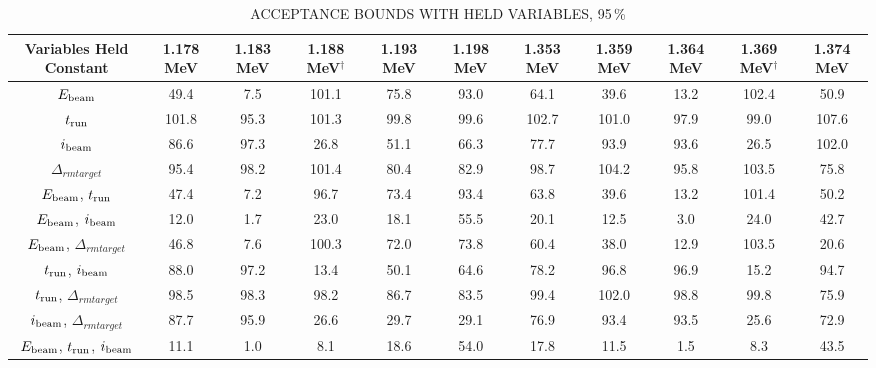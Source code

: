 \begin{landscape}
\begin{table}
    \begin{center}
        \caption{ACCEPTANCE BOUNDS WITH HELD VARIABLES, 95\,\%}
        \label{tab:acceptance-uncertainty-95}
        \begin{tabular}{cS[table-format=4.2]S[table-format=4.2]S[table-format=4.2]S[table-format=4.2]
        S[table-format=4.2]S[table-format=4.2]S[table-format=4.2]S[table-format=4.2]S[table-format=4.2]S[table-format=4.2]
        }
            \toprule
            \midrule
            \textbf{Variables Held Constant} &
                \textbf{1.178 MeV} & \textbf{1.183 MeV} & \textbf{1.188 MeV}$^\dagger$ & \textbf{1.193 MeV} & \textbf{1.198 MeV} &
                \textbf{1.353 MeV} & \textbf{1.359 MeV} & \textbf{1.364 MeV} & \textbf{1.369 MeV}$^\dagger$ & \textbf{1.374 MeV} \\
            \midrule
$E_{\rm beam}$
    &  49.4 &   7.5 & 101.1 &  75.8 &  93.0 &  64.1 &  39.6 &  13.2 & 102.4 &  50.9 \\
$t_{\rm run}$
    & 101.8 &  95.3 & 101.3 &  99.8 &  99.6 & 102.7 & 101.0 &  97.9 &  99.0 & 107.6 \\
$i_{\rm beam}$
    &  86.6 &  97.3 &  26.8 &  51.1 &  66.3 &  77.7 &  93.9 &  93.6 &  26.5 & 102.0 \\
$\Delta_{rm target}$
    &  95.4 &  98.2 & 101.4 &  80.4 &  82.9 &  98.7 & 104.2 &  95.8 & 103.5 &  75.8 \\
$E_{\rm beam}$, $t_{\rm run}$
    &  47.4 &   7.2 &  96.7 &  73.4 &  93.4 &  63.8 &  39.6 &  13.2 & 101.4 &  50.2 \\
$E_{\rm beam}$, $i_{\rm beam}$
    &  12.0 &   1.7 &  23.0 &  18.1 &  55.5 &  20.1 &  12.5 &   3.0 &  24.0 &  42.7 \\
$E_{\rm beam}$, $\Delta_{rm target}$
    &  46.8 &   7.6 & 100.3 &  72.0 &  73.8 &  60.4 &  38.0 &  12.9 & 103.5 &  20.6 \\
$t_{\rm run}$, $i_{\rm beam}$
    &  88.0 &  97.2 &  13.4 &  50.1 &  64.6 &  78.2 &  96.8 &  96.9 &  15.2 &  94.7 \\
$t_{\rm run}$, $\Delta_{rm target}$
    &  98.5 &  98.3 &  98.2 &  86.7 &  83.5 &  99.4 & 102.0 &  98.8 &  99.8 &  75.9 \\
$i_{\rm beam}$, $\Delta_{rm target}$
    &  87.7 &  95.9 &  26.6 &  29.7 &  29.1 &  76.9 &  93.4 &  93.5 &  25.6 &  72.9 \\
$E_{\rm beam}$, $t_{\rm run}$, $i_{\rm beam}$
    &  11.1 &   1.0 &   8.1 &  18.6 &  54.0 &  17.8 &  11.5 &   1.5 &   8.3 &  43.5 \\

\end{tabular}
\end{center}
\end{table}
\end{landscape}
